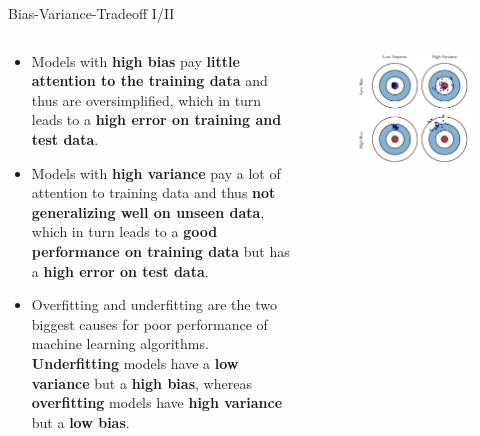 \documentclass[document.tex]{subfiles}
\begin{document}
    \begin{frame}{Bias-Variance-Tradeoff I/II}
        \begin{columns}
            \begin{column}{0.6\textwidth}
                \begin{itemize}	
                    \item Models with \textbf{high bias} pay \textbf{little attention to the training data} and thus are oversimplified, which in turn leads to a \textbf{high error on training and test data}.
                    \item Models with \textbf{high variance} pay a lot of attention to training data and thus \textbf{not generalizing well on unseen data}, which in turn leads to a \textbf{good performance on training data} but has a \textbf{high error on test data}.
                    \item Overfitting and underfitting are the two biggest causes for poor performance of machine learning algorithms. \textbf{Underfitting} models have a \textbf{low variance} but a \textbf{high bias}, whereas \textbf{overfitting} models have \textbf{high variance} but a \textbf{low bias}. 
                \end{itemize}
            \end{column}
            \begin{column}{0.4\textwidth}
                \begin{figure}
                    \label{fig:bias-variance-tradeoff-1}
                    \includegraphics[width=\textwidth, keepaspectratio]{figures/external/bias-variance-tradeoff-1.png}
                \end{figure}
            \end{column}
        \end{columns}
    \end{frame}
\end{document}
